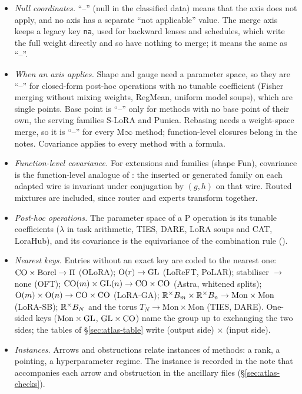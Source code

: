 \begin{itemize}
  \item \emph{Null coordinates.} ``--'' (null in the classified data) means that the axis does not apply, and no axis
  has a separate ``not applicable'' value. The merge axis keeps a legacy key \texttt{na}, used for backward lenses and
  schedules, which write the full weight directly and so have nothing to merge; it means the same as ``--''.
  \item \emph{When an axis applies.} Shape and gauge need a parameter space, so they are ``--'' for closed-form
  post-hoc operations with no tunable coefficient (Fisher merging without mixing weights, RegMean, uniform model soups),
  which are single points. Base point is ``--'' only for methods with no base point of their own, the serving families
  S-LoRA and Punica. Rebasing needs a weight-space merge, so it is ``--'' for every M$\infty$ method; function-level
  closures belong in the notes. Covariance applies to every method with a formula.
  \item \emph{Function-level covariance.} For extensions and families (shape Fun), covariance is the function-level
  analogue of : the inserted or generated family on each adapted wire is invariant under
  conjugation by $(g,h)$ on that wire. Routed mixtures are included, since router and experts transform together.
  \item \emph{Post-hoc operations.} The parameter space of a P operation is its tunable coefficients ($\lambda$ in task
  arithmetic, TIES, DARE, LoRA soups and CAT, LoraHub), and its covariance is the equivariance of the combination rule
  ().
  \item \emph{Nearest keys.} Entries without an exact key are coded to the nearest one: $\mathrm{CO}\times\mathrm{Borel}\to\Pi$
  (OLoRA); $\mathrm{O}(r)\to\mathrm{GL}$ (LoReFT, PoLAR); stabiliser $\to$ none (OFT); $\mathrm{CO}(m)\times\mathrm{GL}(n)\to\mathrm{CO}\times\mathrm{CO}$ (Astra,
  whitened splits); $\mathrm{O}(m)\times\mathrm{O}(n)\to\mathrm{CO}\times\mathrm{CO}$ (LoRA-GA); $\mathbb{R}^\times B_m\times\mathbb{R}^\times B_n\to
  \mathrm{Mon}\times\mathrm{Mon}$ (LoRA-SB); $\mathbb{R}^\times B_N$ and the torus $T_N\to\mathrm{Mon}\times\mathrm{Mon}$ (TIES,
  DARE). One-sided keys ($\mathrm{Mon}\times\mathrm{GL}$, $\mathrm{GL}\times\mathrm{CO}$) name the group up to exchanging the two sides; the
  tables of \S\ref{sec:atlas-table} write (output side) $\times$ (input side).
  \item \emph{Instances.} Arrows and obstructions relate instances of methods: a rank, a pointing, a hyperparameter
  regime. The instance is recorded in the note that accompanies each arrow and obstruction in the ancillary files
  (\S\ref{sec:atlas-checks}).
\end{itemize}

